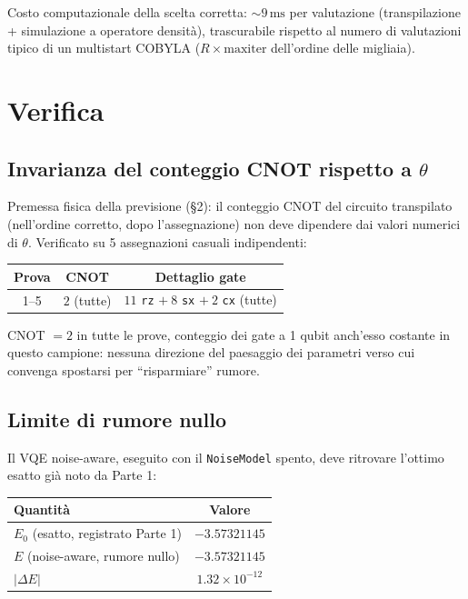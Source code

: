 \documentclass[11pt,a4paper]{article}
\begin{document}
Costo computazionale della scelta corretta: $\sim9\,\text{ms}$ per
valutazione (transpilazione + simulazione a operatore densità),
trascurabile rispetto al numero di valutazioni tipico di un multistart
COBYLA ($R\times\text{maxiter}$ dell'ordine delle migliaia).

\section{Verifica}

\subsection{Invarianza del conteggio CNOT rispetto a \texorpdfstring{$\theta$}{theta}}

Premessa fisica della previsione (§2): il conteggio CNOT del circuito
transpilato (nell'ordine corretto, dopo l'assegnazione) non deve
dipendere dai valori numerici di $\theta$. Verificato su 5 assegnazioni
casuali indipendenti:

\begin{center}
\renewcommand{\arraystretch}{1.2}
\begin{tabular}{@{}ccc@{}}
\toprule
\textbf{Prova} & \textbf{CNOT} & \textbf{Dettaglio gate}\\
\midrule
1--5 & $2$ (tutte) & $11$ \texttt{rz} $+\ 8$ \texttt{sx} $+\ 2$ \texttt{cx} (tutte)\\
\bottomrule
\end{tabular}
\end{center}

\noindent CNOT $=2$ in tutte le prove, conteggio dei gate a 1 qubit anch'esso
costante in questo campione: nessuna direzione del paesaggio dei
parametri verso cui convenga spostarsi per ``risparmiare'' rumore.

\subsection{Limite di rumore nullo}

Il VQE noise-aware, eseguito con il \texttt{NoiseModel} spento, deve
ritrovare l'ottimo esatto già noto da Parte 1:

\begin{center}
\renewcommand{\arraystretch}{1.2}
\begin{tabular}{@{}lc@{}}
\toprule
\textbf{Quantità} & \textbf{Valore}\\
\midrule
$E_0$ (esatto, registrato Parte 1) & $-3.57321145$\\
$E$ (noise-aware, rumore nullo) & $-3.57321145$\\
$|\Delta E|$ & $1.32\times10^{-12}$\\
\bottomrule
\end{tabular}
\end{center}
\end{document}

